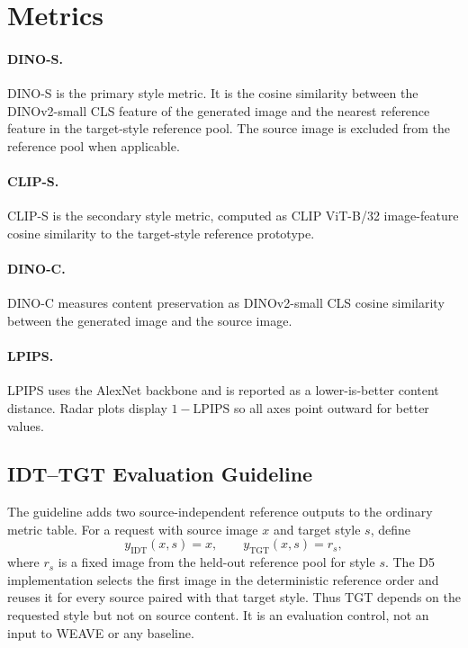 \documentclass[letterpaper]{article}
\newcommand{\weave}{WEAVE}
\newcommand{\dinos}{DINO-S}
\newcommand{\dinoc}{DINO-C}
\newcommand{\clips}{CLIP-S}
\begin{document}
\section{Metrics}

\paragraph{\dinos.}
\dinos{} is the primary style metric. It is the cosine similarity between the DINOv2-small
CLS feature of the generated image and the nearest reference feature in the target-style
reference pool. The source image is excluded from the reference pool when applicable.

\paragraph{\clips.}
\clips{} is the secondary style metric, computed as CLIP ViT-B/32 image-feature cosine
similarity to the target-style reference prototype.

\paragraph{\dinoc.}
\dinoc{} measures content preservation as DINOv2-small CLS cosine similarity between the
generated image and the source image.

\paragraph{LPIPS.}
LPIPS uses the AlexNet backbone and is reported as a lower-is-better content distance.
Radar plots display \(1-\mathrm{LPIPS}\) so all axes point outward for better values.

\subsection{IDT--TGT Evaluation Guideline}

The guideline adds two source-independent reference outputs to the ordinary metric table.
For a request with source image $x$ and target style $s$, define
\begin{equation}
  y_{\mathrm{IDT}}(x,s)=x,
  \qquad
  y_{\mathrm{TGT}}(x,s)=r_s,
\end{equation}
where $r_s$ is a fixed image from the held-out reference pool for style $s$. The D5
implementation selects the first image in the deterministic reference order and reuses it
for every source paired with that target style. Thus TGT depends on the requested style but
not on source content. It is an evaluation control, not an input to \weave{} or any baseline.
\end{document}
